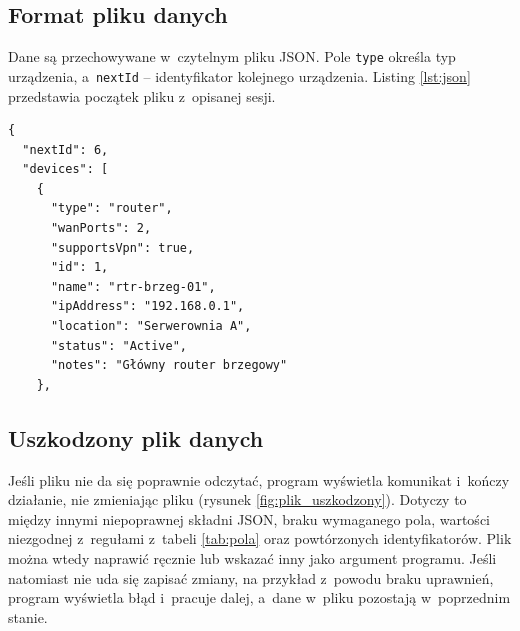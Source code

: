 
\subsection{Format pliku danych}

Dane są przechowywane w~czytelnym pliku JSON. Pole \texttt{type} określa typ urządzenia, a~\texttt{nextId} -- identyfikator kolejnego urządzenia. Listing \ref{lst:json} przedstawia początek pliku z~opisanej sesji.

\noindent
\begin{minipage}{\linewidth}
\begin{lstlisting}[caption={Początek pliku danych},label={lst:json}]
{
  "nextId": 6,
  "devices": [
    {
      "type": "router",
      "wanPorts": 2,
      "supportsVpn": true,
      "id": 1,
      "name": "rtr-brzeg-01",
      "ipAddress": "192.168.0.1",
      "location": "Serwerownia A",
      "status": "Active",
      "notes": "Główny router brzegowy"
    },
\end{lstlisting}
\end{minipage}

\subsection{Uszkodzony plik danych}

Jeśli pliku nie da się poprawnie odczytać, program wyświetla komunikat i~kończy działanie, nie zmieniając pliku (rysunek \ref{fig:plik_uszkodzony}). Dotyczy to między innymi niepoprawnej składni JSON, braku wymaganego pola, wartości niezgodnej z~regułami z~tabeli \ref{tab:pola} oraz powtórzonych identyfikatorów. Plik można wtedy naprawić ręcznie lub wskazać inny jako argument programu. Jeśli natomiast nie uda się zapisać zmiany, na przykład z~powodu braku uprawnień, program wyświetla błąd i~pracuje dalej, a~dane w~pliku pozostają w~poprzednim stanie.


